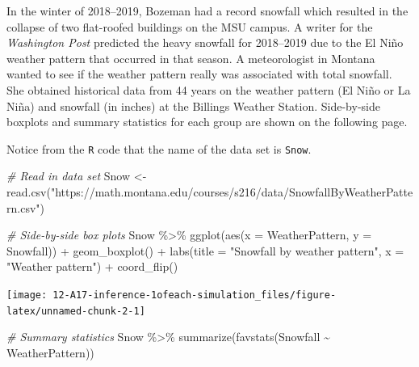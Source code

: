 \documentclass[
]{report}
\newenvironment{Shaded}{\begin{snugshade}}{\end{snugshade}}
\newcommand{\AttributeTok}[1]{\textcolor[rgb]{0.77,0.63,0.00}{#1}}
\newcommand{\CommentTok}[1]{\textcolor[rgb]{0.56,0.35,0.01}{\textit{#1}}}
\newcommand{\FunctionTok}[1]{\textcolor[rgb]{0.00,0.00,0.00}{#1}}
\newcommand{\NormalTok}[1]{#1}
\newcommand{\OtherTok}[1]{\textcolor[rgb]{0.56,0.35,0.01}{#1}}
\newcommand{\SpecialCharTok}[1]{\textcolor[rgb]{0.00,0.00,0.00}{#1}}
\newcommand{\StringTok}[1]{\textcolor[rgb]{0.31,0.60,0.02}{#1}}
\newcommand\latexcode[1]{#1}
\begin{document}
In the winter of 2018--2019, Bozeman had a record snowfall which resulted in the collapse of two flat-roofed buildings on the MSU campus. A writer for the \emph{Washington Post} predicted the heavy snowfall for 2018--2019 due to the El Ni\latexcode{\~{n}}o weather pattern that occurred in that season. A meteorologist in Montana wanted to see if the weather pattern really was associated with total snowfall. She obtained historical data from 44 years on the weather pattern (El Ni\latexcode{\~{n}}o or La Ni\latexcode{\~{n}}a) and snowfall (in inches) at the Billings Weather Station. Side-by-side boxplots and summary statistics for each group are shown on the following page.

Notice from the \texttt{R} code that the name of the data set is \texttt{Snow}.

\begin{Shaded}
\begin{Highlighting}[]
\CommentTok{\# Read in data set}
\NormalTok{Snow }\OtherTok{\textless{}{-}} \FunctionTok{read.csv}\NormalTok{(}\StringTok{"https://math.montana.edu/courses/s216/data/SnowfallByWeatherPattern.csv"}\NormalTok{)}
\end{Highlighting}
\end{Shaded}

\newpage

\begin{Shaded}
\begin{Highlighting}[]
\CommentTok{\# Side{-}by{-}side box plots}
\NormalTok{Snow }\SpecialCharTok{\%\textgreater{}\%}
\FunctionTok{ggplot}\NormalTok{(}\FunctionTok{aes}\NormalTok{(}\AttributeTok{x =}\NormalTok{ WeatherPattern, }\AttributeTok{y =}\NormalTok{ Snowfall)) }\SpecialCharTok{+}
    \FunctionTok{geom\_boxplot}\NormalTok{() }\SpecialCharTok{+} 
    \FunctionTok{labs}\NormalTok{(}\AttributeTok{title =} \StringTok{"Snowfall by weather pattern"}\NormalTok{,}
         \AttributeTok{x =} \StringTok{"Weather pattern"}\NormalTok{) }\SpecialCharTok{+}
    \FunctionTok{coord\_flip}\NormalTok{()}
\end{Highlighting}
\end{Shaded}

\begin{center}\texttt{[image: 12-A17-inference-1ofeach-simulation\_files/figure-latex/unnamed-chunk-2-1]} \end{center}

\begin{Shaded}
\begin{Highlighting}[]
\CommentTok{\# Summary statistics}
\NormalTok{Snow }\SpecialCharTok{\%\textgreater{}\%} 
     \FunctionTok{summarize}\NormalTok{(}\FunctionTok{favstats}\NormalTok{(Snowfall }\SpecialCharTok{\textasciitilde{}}\NormalTok{ WeatherPattern))}
\end{Highlighting}
\end{Shaded}
\end{document}
